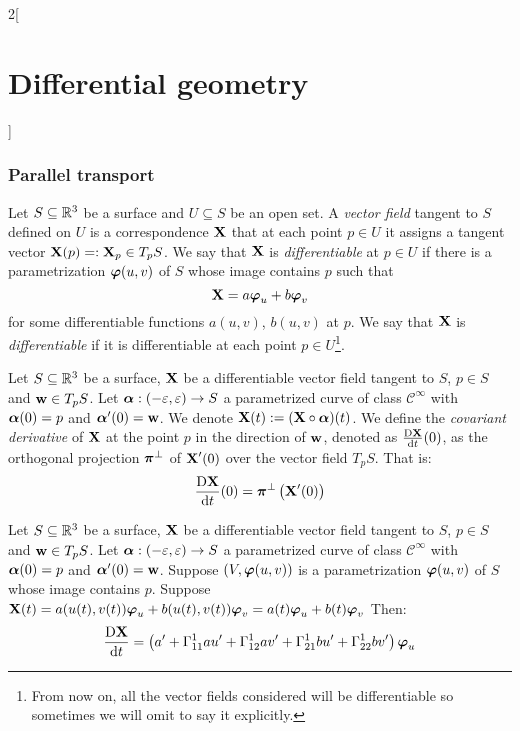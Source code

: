 \documentclass[../../../main.tex]{subfiles}
\begin{document}
\begin{multicols}{2}[\section{Differential geometry}]
  \subsubsection{Parallel transport}
  \begin{definition}
    Let $S\subseteq\mathbb{R}^3$ be a surface and $U\subseteq S$ be an open set. A \emph{vector field} tangent to $S$ defined on $U$ is a correspondence $\boldsymbol{\mathrm{X}}$ that at each point $p\in U$ it assigns a tangent vector $\boldsymbol{\mathrm{X}}(p)=:\boldsymbol{\mathrm{X}}_p\in T_pS$. We say that $\boldsymbol{\mathrm{X}}$ is \emph{differentiable} at $p\in U$ if there is a parametrization $\boldsymbol{\mathrm{\varphi}}(u,v)$ of $S$ whose image contains $p$ such that $$\boldsymbol{\mathrm{X}}=a\boldsymbol{\mathrm{\varphi}}_u+b\boldsymbol{\mathrm{\varphi}}_v$$ for some differentiable functions $a(u,v)$, $b(u,v)$ at $p$. We say that $\boldsymbol{\mathrm{X}}$ is \emph{differentiable} if it is differentiable at each point $p\in U$\footnote{From now on, all the vector fields considered will be differentiable so sometimes we will omit to say it explicitly.}.
  \end{definition}
  \begin{definition}
    Let $S\subseteq\mathbb{R}^3$ be a surface, $\boldsymbol{\mathrm{X}}$ be a differentiable vector field tangent to $S$, $p\in S$ and $\boldsymbol{\mathrm{w}}\in T_pS$. Let $\boldsymbol{\mathrm{\alpha}}:(-\varepsilon,\varepsilon)\rightarrow S$ a parametrized curve of class $\mathcal{C}^\infty$ with $\boldsymbol{\mathrm{\alpha}}(0)=p$ and $\boldsymbol{\mathrm{\alpha}}'(0)=\boldsymbol{\mathrm{w}}$. We denote $\boldsymbol{\mathrm{X}}(t):=(\boldsymbol{\mathrm{X}}\circ\boldsymbol{\mathrm{\alpha}})(t)$. We define the \emph{covariant derivative} of $\boldsymbol{\mathrm{X}}$ at the point $p$ in the direction of $\boldsymbol{\mathrm{w}}$, denoted as $\frac{\text{D}\boldsymbol{\mathrm{X}}}{\dd{t}}(0)$, as the orthogonal projection $\boldsymbol{\mathrm{\pi}}^\perp$ of $\boldsymbol{\mathrm{X}}'(0)$ over the vector field $T_pS$. That is: $$\frac{\text{D}\boldsymbol{\mathrm{X}}}{\dd{t}}(0)=\boldsymbol{\mathrm{\pi}}^\perp\left(\boldsymbol{\mathrm{X}}'(0)\right)$$
  \end{definition}
  \begin{proposition}
    Let $S\subseteq\mathbb{R}^3$ be a surface, $\boldsymbol{\mathrm{X}}$ be a differentiable vector field tangent to $S$, $p\in S$ and $\boldsymbol{\mathrm{w}}\in T_pS$. Let $\boldsymbol{\mathrm{\alpha}}:(-\varepsilon,\varepsilon)\rightarrow S$ a parametrized curve of class $\mathcal{C}^\infty$ with $\boldsymbol{\mathrm{\alpha}}(0)=p$ and $\boldsymbol{\mathrm{\alpha}}'(0)=\boldsymbol{\mathrm{w}}$. Suppose $(V,\boldsymbol{\mathrm{\varphi}}(u,v))$ is a parametrization $\boldsymbol{\mathrm{\varphi}}(u,v)$ of $S$ whose image contains $p$. Suppose $\boldsymbol{\mathrm{X}}(t)=a(u(t),v(t))\boldsymbol{\mathrm{\varphi}}_u+b(u(t),v(t))\boldsymbol{\mathrm{\varphi}}_v=a(t)\boldsymbol{\mathrm{\varphi}}_u+b(t)\boldsymbol{\mathrm{\varphi}}_v$ Then:
    \begin{multline}\label{DG_covderivative}
      \frac{\text{D}\vf{X}}{\dd{t}}=\left(a'+\Gamma_{11}^1au'+\Gamma_{12}^1av'+\Gamma_{21}^1bu'+\Gamma_{22}^1bv'\right)\vf\varphi_u\\

\end{multline}
\end{proposition}
\end{multicols}
\end{document}
